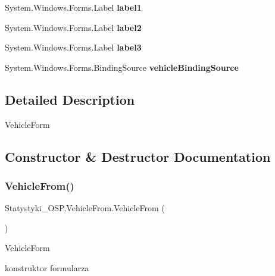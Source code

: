 \begin{DoxyCompactItemize}
System.\+Windows.\+Forms.\+Label {\bfseries label1}
\item 
\mbox{\label{class_statystyki___o_s_p_1_1_vehicle_from_ae36c7d592e27dbf00260b6166bcd2795}} 
System.\+Windows.\+Forms.\+Label {\bfseries label2}
\item 
\mbox{\label{class_statystyki___o_s_p_1_1_vehicle_from_a5d773eacc1320daaf1095a2b4f6bfc52}} 
System.\+Windows.\+Forms.\+Label {\bfseries label3}
\item 
\mbox{\label{class_statystyki___o_s_p_1_1_vehicle_from_a1518f6d54af961a9e351defaf980e680}} 
System.\+Windows.\+Forms.\+Binding\+Source {\bfseries vehicle\+Binding\+Source}
\end{DoxyCompactItemize}


\subsection{Detailed Description}
Vehicle\+Form 



\subsection{Constructor \& Destructor Documentation}
\mbox{\label{class_statystyki___o_s_p_1_1_vehicle_from_a5873dd3f6c9ede7042a142ee79314c68}} 
\subsubsection{\texorpdfstring{VehicleFrom()}{VehicleFrom()}\hspace{0.1cm}{\footnotesize\ttfamily [1/2]}}
{\footnotesize\ttfamily Statystyki\+\_\+\+O\+S\+P.\+Vehicle\+From.\+Vehicle\+From (\begin{DoxyParamCaption}{ }\end{DoxyParamCaption})}



Vehicle\+Form 

konstruktor formularza\mbox{\label{class_statystyki___o_s_p_1_1_vehicle_from_a78a33047a3fbb0f70140f1406dafb10a}} 
